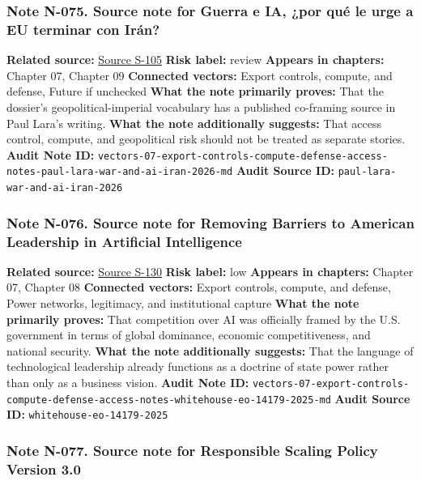 \documentclass[
  american,
  11pt,
  letterpaper,
]{article}
\begin{document}
\subsubsection{Note N-075. Source note for Guerra e IA, ¿por qué le urge
a EU terminar con
Irán?}\label{note-n-075-vectors-07-export-controls-compute-defense-access-notes-paul-lara-war-and-ai-iran-2026-md}

\textbf{Related source:}
\hyperref[source-s-105-guerra-e-ia-por-qu-le-urge-a-eu-terminar-con-ir-n]{Source
S-105} \textbf{Risk label:} review \textbf{Appears in chapters:} Chapter
07, Chapter 09 \textbf{Connected vectors:} Export controls, compute, and
defense, Future if unchecked \textbf{What the note primarily proves:}
That the dossier's geopolitical-imperial vocabulary has a published
co-framing source in Paul Lara's writing. \textbf{What the note
additionally suggests:} That access control, compute, and geopolitical
risk should not be treated as separate stories. \textbf{Audit Note ID:}
\texttt{vectors-07-export-controls-compute-defense-access-notes-paul-lara-war-and-ai-iran-2026-md}
\textbf{Audit Source ID:} \texttt{paul-lara-war-and-ai-iran-2026}

\subsubsection{Note N-076. Source note for Removing Barriers to American
Leadership in Artificial
Intelligence}\label{note-n-076-vectors-07-export-controls-compute-defense-access-notes-whitehouse-eo-14179-2025-md}

\textbf{Related source:}
\hyperref[source-s-130-removing-barriers-to-american-leadership-in-artificial-intelligence]{Source
S-130} \textbf{Risk label:} low \textbf{Appears in chapters:} Chapter
07, Chapter 08 \textbf{Connected vectors:} Export controls, compute, and
defense, Power networks, legitimacy, and institutional capture
\textbf{What the note primarily proves:} That competition over AI was
officially framed by the U.S. government in terms of global dominance,
economic competitiveness, and national security. \textbf{What the note
additionally suggests:} That the language of technological leadership
already functions as a doctrine of state power rather than only as a
business vision. \textbf{Audit Note ID:}
\texttt{vectors-07-export-controls-compute-defense-access-notes-whitehouse-eo-14179-2025-md}
\textbf{Audit Source ID:} \texttt{whitehouse-eo-14179-2025}

\subsubsection{Note N-077. Source note for Responsible Scaling Policy
Version
3.0}\label{note-n-077-vectors-08-power-networks-legitimacy-capture-notes-anthropic-rsp-v3-announcement-2026-md}
\end{document}
